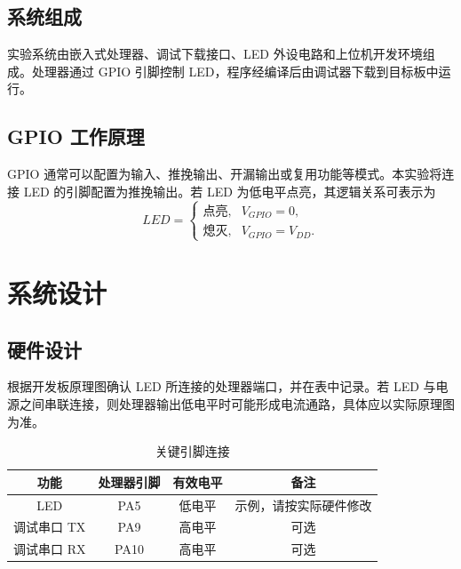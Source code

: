 \documentclass[UTF8,zihao=-4,a4paper,oneside,fontset=fandol]{ctexart}
\begin{document}
\subsection{系统组成}
实验系统由嵌入式处理器、调试下载接口、LED 外设电路和上位机开发环境组成。处理器通过 GPIO 引脚控制 LED，程序经编译后由调试器下载到目标板中运行。

\subsection{GPIO 工作原理}
GPIO 通常可以配置为输入、推挽输出、开漏输出或复用功能等模式。本实验将连接 LED 的引脚配置为推挽输出。若 LED 为低电平点亮，其逻辑关系可表示为
\begin{equation}
  LED =
  \begin{cases}
    \text{点亮}, & V_{GPIO}=0,\\
    \text{熄灭}, & V_{GPIO}=V_{DD}.
  \end{cases}
  \label{eq:led-logic}
\end{equation}

\section{系统设计}
\subsection{硬件设计}
%
%

根据开发板原理图确认 LED 所连接的处理器端口，并在表中记录。若 LED 与电源之间串联连接，则处理器输出低电平时可能形成电流通路，具体应以实际原理图为准。

\begin{table}[H]
  \centering
  \caption{关键引脚连接}
  \label{tab:pins}
  \begin{tabular}{cccc}
    \toprule
    功能 & 处理器引脚 & 有效电平 & 备注 \\
    \midrule
    LED & PA5 & 低电平 & 示例，请按实际硬件修改 \\
    调试串口 TX & PA9 & 高电平 & 可选 \\
    调试串口 RX & PA10 & 高电平 & 可选 \\
    \bottomrule
  \end{tabular}
\end{table}
\end{document}

